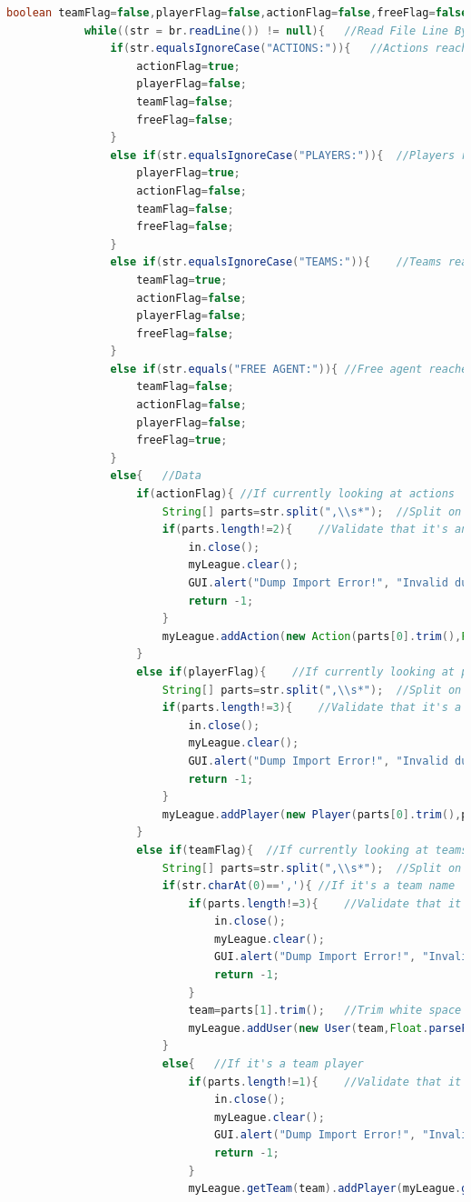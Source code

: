 \documentclass[12pt]{report}
\begin{document}
\begin{singlespace}
\begin{lstlisting}[language=Java,label=some-code,caption={IOManager.java}]
			boolean teamFlag=false,playerFlag=false,actionFlag=false,freeFlag=false;
			while((str = br.readLine()) != null){	//Read File Line By Line
				if(str.equalsIgnoreCase("ACTIONS:")){	//Actions reached
					actionFlag=true;
					playerFlag=false;
					teamFlag=false;
					freeFlag=false;
				}
				else if(str.equalsIgnoreCase("PLAYERS:")){	//Players reached
					playerFlag=true;
					actionFlag=false;
					teamFlag=false;
					freeFlag=false;
				}
				else if(str.equalsIgnoreCase("TEAMS:")){	//Teams reached
					teamFlag=true;
					actionFlag=false;
					playerFlag=false;
					freeFlag=false;
				}
				else if(str.equals("FREE AGENT:")){	//Free agent reached
					teamFlag=false;
					actionFlag=false;
					playerFlag=false;
					freeFlag=true;
				}
				else{	//Data
					if(actionFlag){	//If currently looking at actions
						String[] parts=str.split(",\\s*");	//Split on commas
						if(parts.length!=2){	//Validate that it's an action
							in.close();
							myLeague.clear();
							GUI.alert("Dump Import Error!", "Invalid dump file!");
							return -1;
						}
						myLeague.addAction(new Action(parts[0].trim(),Float.parseFloat(parts[1].trim())));	//Add action to league
					}
					else if(playerFlag){	//If currently looking at players
						String[] parts=str.split(",\\s*");	//Split on commas
						if(parts.length!=3){	//Validate that it's a player
							in.close();
							myLeague.clear();
							GUI.alert("Dump Import Error!", "Invalid dump file!");
							return -1;
						}
						myLeague.addPlayer(new Player(parts[0].trim(),parts[1].trim(),Float.parseFloat(parts[2].trim())));	//Add player to league
					}
					else if(teamFlag){	//If currently looking at teams
						String[] parts=str.split(",\\s*");	//Split on commas
						if(str.charAt(0)==','){	//If it's a team name
							if(parts.length!=3){	//Validate that it's a team name
								in.close();
								myLeague.clear();
								GUI.alert("Dump Import Error!", "Invalid dump file!");
								return -1;
							}
							team=parts[1].trim();	//Trim white space
							myLeague.addUser(new User(team,Float.parseFloat(parts[2].trim())));	//Add team to league
						}
						else{	//If it's a team player
							if(parts.length!=1){	//Validate that it's a player name
								in.close();
								myLeague.clear();
								GUI.alert("Dump Import Error!", "Invalid dump file!");
								return -1;
							}
							myLeague.getTeam(team).addPlayer(myLeague.getPlayer(parts[0].trim()));	//Get reference to player and add to team

\end{lstlisting}
\end{singlespace}
\end{document}
